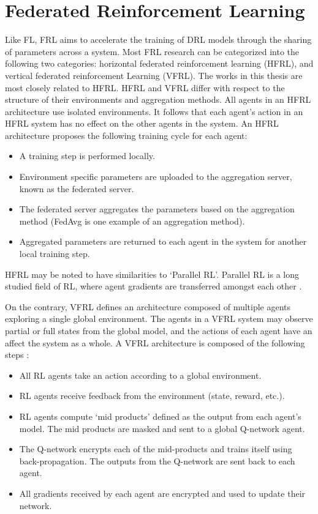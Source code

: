 \section{Federated Reinforcement Learning}
Like FL, FRL aims to accelerate the training of DRL models through the sharing of parameters
across a system. Most FRL research can be categorized into the following two categories:
horizontal federated reinforcement learning (HFRL), and vertical federated reinforcement
Learning (VFRL).  The works in this thesis are most closely related to HFRL.  HFRL and VFRL
differ with respect to the structure of their environments and aggregation methods.  All
agents in an HFRL architecture use isolated environments. It follows that each agent's action
in an HFRL system has no effect on the other agents in the system.  An HFRL architecture
proposes the following training cycle for each agent:

\begin{itemize}
    \item A training step is performed locally.
    \item Environment specific parameters are uploaded to the aggregation server,
    known as the federated server.
    \item The federated server aggregates the parameters based on the aggregation
    method (FedAvg is one example of an aggregation method).
    \item Aggregated parameters are returned to each agent in the system for
    another local training step.
\end{itemize}

HFRL may be noted to have similarities to `Parallel RL'.  Parallel RL is a long studied
field of RL, where agent gradients are transferred amongst each other
\cite{Lim2020, Nadiger2019}.

On the contrary, VFRL defines an architecture composed
of multiple agents exploring a single global environment. The agents in a VFRL system
may observe partial or full states from the global model, and the actions of each agent
have an affect the system as a whole. A VFRL architecture is composed of the following steps \cite{IntelAI19}:

\begin{itemize}
    \item All RL agents take an action according to a global environment.
    \item RL agents receive feedback from the environment (state, reward, etc.).
    \item RL agents compute `mid products' defined as the output from each agent's model.
    The mid products are masked and sent to a global Q-network agent.
    \item The Q-network encrypts each of the mid-products and trains itself using back-propagation.
    The outputs from the Q-network are sent back to each agent.
    \item All gradients received by each agent are encrypted and used to update their network.
\end{itemize}

